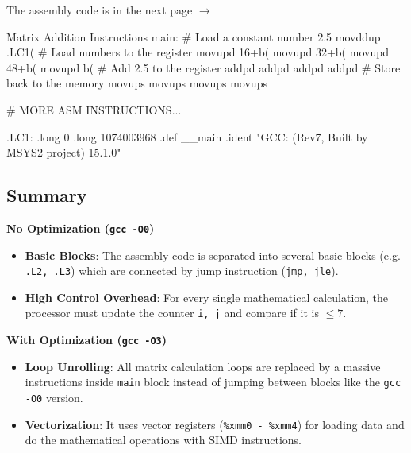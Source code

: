 \documentclass[12pt, a4paper]{article}
\begin{document}
            The assembly code is in the next page $\rightarrow$

    \pagebreak

            \begin{codeblock}[minted language=asm]{Matrix Addition Instructions}
                main:
                    # Load a constant number 2.5
                    movddup .LC1(%
                    # Load numbers to the register
                    movupd  16+b(%
                    movupd  32+b(%
                    movupd  48+b(%
                    movupd  b(%
                    # Add 2.5 to the register
                    addpd   %
                    addpd   %
                    addpd   %
                    addpd   %
                    # Store back to the memory
                    movups  %
                    movups  %
                    movups  %
                    movups  %

                    # MORE ASM INSTRUCTIONS...
                
                .LC1:
                    .long   0
                    .long   1074003968
                    .def    __main
                    .ident  "GCC: (Rev7, Built by MSYS2 project) 15.1.0"
            \end{codeblock}

    \pagebreak

            \subsection{Summary}

                \noindent \textbf{No Optimization (\texttt{gcc -O0})}
                \begin{itemize}
                    \item \textbf{Basic Blocks}: The assembly code is separated into several basic blocks
                    (e.g. \texttt{.L2, .L3}) which are connected by jump instruction (\texttt{jmp, jle}).
                    \item \textbf{High Control Overhead}: For every single mathematical calculation, the processor
                    must update the counter \texttt{i, j} and compare if it is $\leq 7$.
                \end{itemize}

                \noindent \textbf{With Optimization (\texttt{gcc -O3})}
                \begin{itemize}
                    \item \textbf{Loop Unrolling}: All matrix calculation loops are replaced by a massive instructions
                    inside \texttt{main} block instead of jumping between blocks like the \texttt{gcc -O0} version.
                    \item \textbf{Vectorization}: It uses vector registers (\texttt{\%xmm0 - \%xmm4}) for loading
                    data and do the mathematical operations with SIMD instructions.
                \end{itemize}
\end{document}
